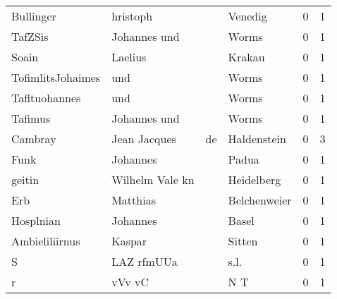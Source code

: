 \begin{tabular}{llllrr}
                Bullinger &                           hristoph &             &                                     Venedig &          0 &         1 \\
                  TafZSis &                       Johannes und &             &                                       Worms &          0 &         1 \\
                    Soain &                            Laelius &             &                                      Krakau &          0 &         1 \\
        TofimlitsJohaimes &                                und &             &                                       Worms &          0 &         1 \\
            Tafltuohannes &                                und &             &                                       Worms &          0 &         1 \\
                  Tafimus &                       Johannes und &             &                                       Worms &          0 &         1 \\
                  Cambray &                       Jean Jacques &          de &                                 Haldenstein &          0 &         3 \\
                     Funk &                           Johannes &             &                                       Padua &          0 &         1 \\
                   geitin &                    Wilhelm Vale kn &             &                                  Heidelberg &          0 &         1 \\
                      Erb &                           Matthias &             &                                Belchenweier &          0 &         1 \\
                Hosplnian &                           Johannes &             &                                       Basel &          0 &         1 \\
           Ambieliliirnus &                             Kaspar &             &                                      Sitten &          0 &         1 \\
                        S &                         LAZ rfmUUa &             &                                        s.l. &          0 &         1 \\
                        r &                             vVv vC &             &                                         N T &          0 &         1 \\

\end{tabular}
